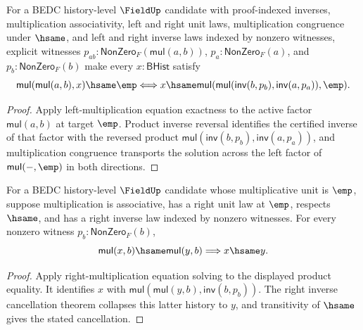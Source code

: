 \begin{theorem}
\label{thm:field-product-left-mul-empty-equation-exact-from-apartness}
For a BEDC history-level $\FieldUp$ candidate with proof-indexed inverses,
multiplication associativity, left and right unit laws, multiplication
congruence under $\hsame$, and left and right inverse laws indexed by nonzero
witnesses, explicit witnesses
$p_{ab}:\mathsf{NonZero}_F(\mathsf{mul}(a,b))$,
$p_a:\mathsf{NonZero}_F(a)$, and $p_b:\mathsf{NonZero}_F(b)$ make every
$x:\mathsf{BHist}$ satisfy
$$
\mathsf{mul}(\mathsf{mul}(a,b),x)\hsame \emp
\Longleftrightarrow
x\hsame
\mathsf{mul}(\mathsf{mul}(\mathsf{inv}(b,p_b),\mathsf{inv}(a,p_a)),\emp).
$$
\end{theorem}
\begin{proof}
Apply left-multiplication equation exactness to the active factor
$\mathsf{mul}(a,b)$ at target $\emp$. Product inverse reversal identifies
the certified inverse of that factor with the reversed product
$\mathsf{mul}(\mathsf{inv}(b,p_b),\mathsf{inv}(a,p_a))$, and multiplication
congruence transports the solution across the left factor of
$\mathsf{mul}(-,\emp)$ in both directions.
\end{proof}

\begin{theorem}
\label{thm:field-empty-unit-right-mul-cancel-from-apartness}
For a BEDC history-level $\FieldUp$ candidate whose multiplicative unit is
$\emp$, suppose multiplication is associative, has a right unit law at $\emp$,
respects $\hsame$, and has a right inverse law indexed by nonzero witnesses.
For every nonzero witness $p_b:\mathsf{NonZero}_F(b)$,
$$
\mathsf{mul}(x,b)\hsame\mathsf{mul}(y,b)
\Longrightarrow
x\hsame y.
$$
\end{theorem}
\begin{proof}
Apply right-multiplication equation solving to the displayed product equality.
It identifies $x$ with
$\mathsf{mul}(\mathsf{mul}(y,b),\mathsf{inv}(b,p_b))$. The right inverse
cancellation theorem collapses this latter history to $y$, and transitivity of
$\hsame$ gives the stated cancellation.
\end{proof}

